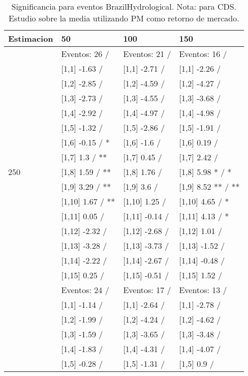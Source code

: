 \begin{table}

\caption{Significancia para eventos BrazilHydrological. Nota: para CDS. Estudio sobre la media utilizando PM como retorno de mercado.}
\centering
\begin{tabular}[t]{llll}
\toprule
Estimacion & 50 & 100 & 150\\
\midrule
 & Eventos:  26 / & Eventos:  21 / & Eventos:  16 /\\
 & {}[1,1] -1.63  / & {}[1,1] -2.71  / & {}[1,1] -2.26  /\\
 & {}[1,2] -2.85  / & {}[1,2] -4.59  / & {}[1,2] -4.27  /\\
 & {}[1,3] -2.73  / & {}[1,3] -4.55  / & {}[1,3] -3.68  /\\
 & {}[1,4] -2.92  / & {}[1,4] -4.97  / & {}[1,4] -4.98  /\\
\addlinespace
 & {}[1,5] -1.32  / & {}[1,5] -2.86  / & {}[1,5] -1.91  /\\
 & {}[1,6] -0.15  / * & {}[1,6] -1.6  / & {}[1,6] 0.19  /\\
 & {}[1,7] 1.3  / ** & {}[1,7] 0.45  / & {}[1,7] 2.42  /\\
250 & {}[1,8] 1.59  / ** & {}[1,8] 1.76  / & {}[1,8] 5.98 * / *\\
 & {}[1,9] 3.29  / ** & {}[1,9] 3.6  / & {}[1,9] 8.52 ** / **\\
\addlinespace
 & {}[1,10] 1.67  / ** & {}[1,10] 1.25  / & {}[1,10] 4.65  / *\\
 & {}[1,11] 0.05  / & {}[1,11] -0.14  / & {}[1,11] 4.13  / *\\
 & {}[1,12] -2.32  / & {}[1,12] -2.68  / & {}[1,12] 1.01  /\\
 & {}[1,13] -3.28  / & {}[1,13] -3.73  / & {}[1,13] -1.52  /\\
 & {}[1,14] -2.22  / & {}[1,14] -2.67  / & {}[1,14] -0.48  /\\
\addlinespace
 & {}[1,15] 0.25  / & {}[1,15] -0.51  / & {}[1,15] 1.52  /\\
 & Eventos:  24 / & Eventos:  17 / & Eventos:  13 /\\
 & {}[1,1] -1.14  / & {}[1,1] -2.64  / & {}[1,1] -2.78  /\\
 & {}[1,2] -1.99  / & {}[1,2] -4.24  / & {}[1,2] -4.62  /\\
 & {}[1,3] -1.59  / & {}[1,3] -3.65  / & {}[1,3] -3.48  /\\
\addlinespace
 & {}[1,4] -1.83  / & {}[1,4] -4.31  / & {}[1,4] -4.07  /\\
 & {}[1,5] -0.28  / & {}[1,5] -1.31  / & {}[1,5] 0.9  /\\

\end{tabular}
\end{table}
